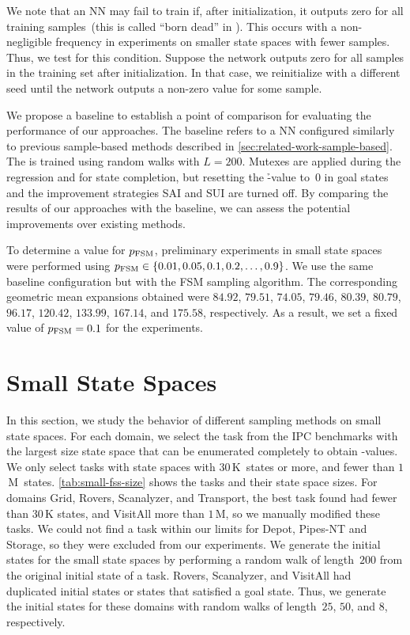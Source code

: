 We note that an NN may fail to train if, after initialization, it outputs zero for all training samples~(this is called ``born dead'' in \citet{lu2020dying}). This occurs with a non-negligible frequency in experiments on smaller state spaces with fewer samples. Thus, we test for this condition. Suppose the network outputs zero for all samples in the training set after initialization. In that case, we reinitialize with a different seed until the network outputs a non-zero value for some sample.

We propose a baseline \hnnbase to establish a point of comparison for evaluating the performance of our approaches. The baseline refers to a NN configured similarly to previous sample-based methods described in \cref{sec:related-work-sample-based}. The \hnnbase is trained using random walks with $L=200$. Mutexes are applied during the regression and for state completion, but resetting the \h-value to~$0$ in goal states and the improvement strategies SAI and SUI are turned off. By comparing the results of our approaches with the baseline, we can assess the potential improvements over existing methods.

To determine a value for $p_{\text{FSM}}$, preliminary experiments in small state spaces were performed using $p_{\text{FSM}}\in\{0.01,0.05,0.1,0.2,\ldots,0.9\}$. We use the same baseline configuration but with the FSM sampling algorithm. The corresponding geometric mean expansions obtained were $84.92$, $79.51$, $74.05$, $79.46$, $80.39$, $80.79$, $96.17$, $120.42$, $133.99$, $167.14$, and $175.58$, respectively. As a result, we set a fixed value of $p_{\text{FSM}} = 0.1$ for the experiments.

\section{Small State Spaces}
\label{sec:small-experiments}

In this section, we study the behavior of different sampling methods on small state spaces. For each domain, we select the task from the IPC benchmarks with the largest size state space that can be enumerated completely to obtain \hstar-values. We only select tasks with state spaces with $30$\,K~states or more, and fewer than $1$\,M~states. \cref{tab:small-fss-size} shows the tasks and their state space sizes. For domains Grid, Rovers, Scanalyzer, and Transport, the best task found had fewer than $30$\,K states, and VisitAll more than $1$\,M, so we manually modified these tasks. We could not find a task within our limits for Depot, Pipes-NT and Storage, so they were excluded from our experiments. We generate the initial states for the small state spaces by performing a random walk of length~$200$ from the original initial state of a task. Rovers, Scanalyzer, and VisitAll had duplicated initial states or states that satisfied a goal state. Thus, we generate the initial states for these domains with random walks of length~$25$, $50$, and $8$, respectively.

